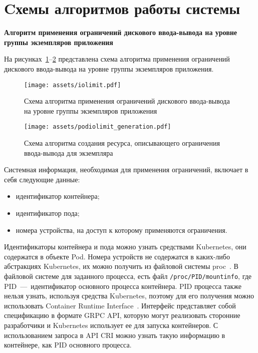 \section{Cхемы алгоритмов работы системы}

\textbf{Алгоритм применения ограничений дискового ввода-вывода на уровне группы экземпляров приложения}

На рисунках~\ref{img:iolimit}--\ref{img:podiolimit_generation} представлена схема алгоритма применения ограничений дискового ввода-вывода на уровне группы экземпляров приложения.

\newpage

\begin{figure}[h!]
    \centering
    \texttt{[image: assets/iolimit.pdf]}
    \caption{Схема алгоритма применения ограничений дискового ввода-вывода на уровне группы экземпляров приложения}
    \label{img:iolimit}
\end{figure}

\newpage

\begin{figure}[h!]
    \centering
    \texttt{[image: assets/podiolimit\_generation.pdf]}
    \caption{Схема алгоритма создания ресурса, описывающего ограничения ввода-вывода для экземпляра}
    \label{img:podiolimit_generation}
\end{figure}

\newpage

Системная информация, необходимая для применения ограничений, включает в себя следующие данные:

\begin{itemize}
	\item идентификатор контейнера;
	\item идентификатор пода;
	\item номера устройства, на доступ к которому применяются ограничения.
\end{itemize}

Идентификаторы контейнера и пода можно узнать средствами Kubernetes, они содержатся в объекте Pod. Номера устройств не содержатся в каких-либо абстракциях Kubernetes, их можно получить из файловой системы proc~\cite{proc}. В файловой системе для заданного процесса, есть файл \texttt{/proc/PID/mountinfo}, где PID~---~идентификатор основного процесса контейнера. PID процесса также нельзя узнать, используя средства Kubernetes, поэтому для его получения можно использовать Container Runtime Interface~\cite{cri}. Интерфейс представляет собой спецификацию в формате GRPC API, которую могут реализовать сторонние разработчики и Kubernetes использует ее для запуска контейнеров. С использованием запроса в API CRI можно узнать такую информацию в контейнере, как PID основного процесса.

